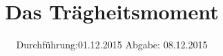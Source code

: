 

\subject{VERSUCH NUMMER 101 (Korrektur)}
\title{Das Trägheitsmoment}
\date{
  Durchführung:01.12.2015
  \hspace{3em}
  Abgabe: 08.12.2015
}



\maketitle
\thispagestyle{empty}
\tableofcontents
\newpage







\printbibliography


